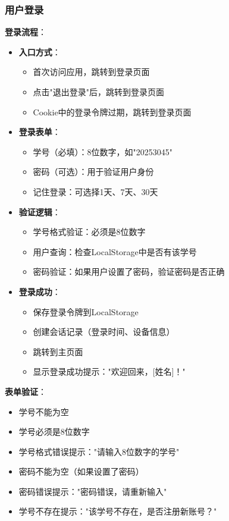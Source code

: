 \documentclass[12pt,a4paper]{article}
\begin{document}
\subsubsection{用户登录}

\textbf{登录流程}：
\begin{itemize}
    \item \textbf{入口方式}：
        \begin{itemize}
            \item 首次访问应用，跳转到登录页面
            \item 点击"退出登录"后，跳转到登录页面
            \item Cookie中的登录令牌过期，跳转到登录页面
        \end{itemize}
    \item \textbf{登录表单}：
        \begin{itemize}
            \item 学号（必填）：8位数字，如"20253045"
            \item 密码（可选）：用于验证用户身份
            \item 记住登录：可选择1天、7天、30天
        \end{itemize}
    \item \textbf{验证逻辑}：
        \begin{itemize}
            \item 学号格式验证：必须是8位数字
            \item 用户查询：检查LocalStorage中是否有该学号
            \item 密码验证：如果用户设置了密码，验证密码是否正确
        \end{itemize}
    \item \textbf{登录成功}：
        \begin{itemize}
            \item 保存登录令牌到LocalStorage
            \item 创建会话记录（登录时间、设备信息）
            \item 跳转到主页面
            \item 显示登录成功提示："欢迎回来，[姓名]！"
        \end{itemize}
\end{itemize}

\textbf{表单验证}：
\begin{itemize}
    \item 学号不能为空
    \item 学号必须是8位数字
    \item 学号格式错误提示："请输入8位数字的学号"
    \item 密码不能为空（如果设置了密码）
    \item 密码错误提示："密码错误，请重新输入"
    \item 学号不存在提示："该学号不存在，是否注册新账号？"
\end{itemize}
\end{document}
